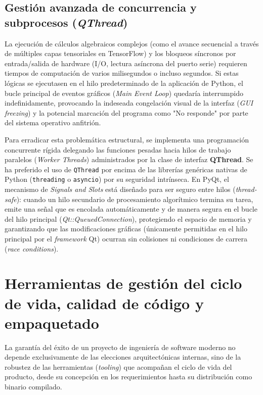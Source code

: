 \subsection*{Gestión avanzada de concurrencia y subprocesos (\textit{QThread})}

La ejecución de cálculos algebraicos complejos (como el avance secuencial a través de múltiples capas tensoriales en TensorFlow) y los bloqueos síncronos por entrada/salida de hardware (I/O, lectura asíncrona del puerto serie) requieren tiempos de computación de varios milisegundos o incluso segundos. Si estas lógicas se ejecutasen en el hilo predeterminado de la aplicación de Python, el bucle principal de eventos gráficos (\textit{Main Event Loop}) quedaría interrumpido indefinidamente, provocando la indeseada congelación visual de la interfaz (\textit{GUI freezing}) y la potencial marcación del programa como "No responde" por parte del sistema operativo anfitrión.

Para erradicar esta problemática estructural, se implementa una programación concurrente rígida delegando las funciones pesadas hacia hilos de trabajo paralelos (\textit{Worker Threads}) administrados por la clase de interfaz \textbf{QThread\cite{qt6qthread2024}}. Se ha preferido el uso de \texttt{QThread} por encima de las librerías genéricas nativas de Python (\texttt{threading} o \texttt{asyncio}) por su seguridad intrínseca. En PyQt, el mecanismo de \textit{Signals and Slots} está diseñado para ser seguro entre hilos (\textit{thread-safe}): cuando un hilo secundario de procesamiento algorítmico termina su tarea, emite una señal que es encolada automáticamente y de manera segura en el bucle del hilo principal (\textit{Qt::QueuedConnection}), protegiendo el espacio de memoria y garantizando que las modificaciones gráficas (únicamente permitidas en el hilo principal por el \textit{framework} Qt) ocurran sin colisiones ni condiciones de carrera (\textit{race conditions}).

\section{Herramientas de gestión del ciclo de vida, calidad de código y empaquetado}

La garantía del éxito de un proyecto de ingeniería de software moderno no depende exclusivamente de las elecciones arquitectónicas internas, sino de la robustez de las herramientas (\textit{tooling}) que acompañan el ciclo de vida del producto, desde su concepción en los requerimientos hasta su distribución como binario compilado.

